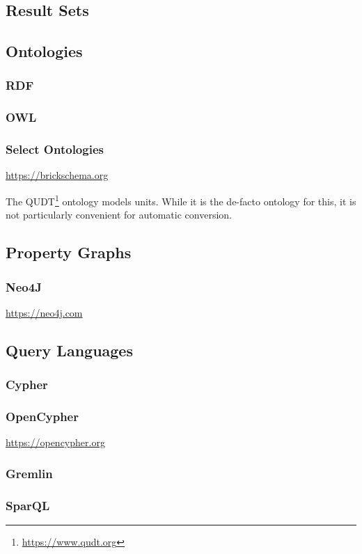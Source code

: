 
\subsection{Result Sets}



\subsection{Ontologies}
\subsubsection{RDF}
\subsubsection{OWL}
\subsubsection{Select Ontologies}

\url{https://brickschema.org}



The QUDT\footnote{\url{https://www.qudt.org}} ontology models units. While it is the de-facto ontology for this, it is not particularly convenient for automatic conversion.

\subsection{Property Graphs}
\subsubsection{Neo4J}

\url{https://neo4j.com}

\subsection{Query Languages}
\subsubsection{Cypher}
\subsubsection{OpenCypher}

\url{https://opencypher.org}

\subsubsection{Gremlin}
\subsubsection{SparQL}


